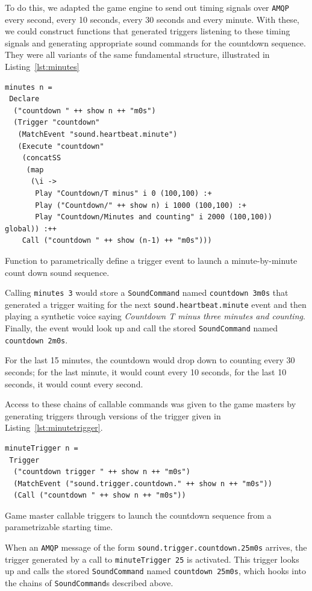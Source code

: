 To do this, we adapted the game engine to send out timing signals over
\texttt{AMQP} every second, every 10 seconds, every 30 seconds and
every minute. With these, we could construct functions that generated
triggers listening to these timing signals and generating appropriate
sound commands for the countdown sequence. They were all variants of
the same fundamental structure, illustrated in Listing~\ref{lst:minutes}

\begin{listing}
\begin{verbatim}
minutes n = 
 Declare 
  ("countdown " ++ show n ++ "m0s")
  (Trigger "countdown"
   (MatchEvent "sound.heartbeat.minute")
   (Execute "countdown" 
    (concatSS 
     (map 
      (\i -> 
       Play "Countdown/T minus" i 0 (100,100) :+
       Play ("Countdown/" ++ show n) i 1000 (100,100) :+
       Play "Countdown/Minutes and counting" i 2000 (100,100)) global)) :++
    Call ("countdown " ++ show (n-1) ++ "m0s")))
\end{verbatim}
\caption{Function to parametrically define a trigger event to launch a
minute-by-minute count down sound sequence.}
\label{lst:minutes}
\end{listing}

Calling \texttt{minutes 3} would store a \texttt{SoundCommand} named
\texttt{countdown 3m0s} that generated a trigger waiting for the next
\texttt{sound.heartbeat.minute} event and then playing a synthetic
voice saying \textit{Countdown T minus three minutes and
  counting}. Finally, the event would look up and call the stored
\texttt{SoundCommand} named \texttt{countdown 2m0s}.

For the last 15 minutes, the countdown would drop down to counting
every 30 seconds; for the last minute, it would count every 10 seconds, for
the last 10 seconds, it would count every second.

Access to these chains of callable commands was given to the game
masters by generating triggers through versions of the trigger given
in Listing~\ref{lst:minutetrigger}.

\begin{listing}
\begin{verbatim}
minuteTrigger n = 
 Trigger 
  ("countdown trigger " ++ show n ++ "m0s") 
  (MatchEvent ("sound.trigger.countdown." ++ show n ++ "m0s")) 
  (Call ("countdown " ++ show n ++ "m0s"))
\end{verbatim}
\caption{Game master callable triggers to launch the countdown
  sequence from a parametrizable starting time.}
\label{lst:minutetrigger}
\end{listing}

When an \texttt{AMQP} message of the form
\texttt{sound.trigger.countdown.25m0s} arrives, the trigger generated
by a call to \texttt{minuteTrigger 25} is activated. This trigger
looks up and calls the stored \texttt{SoundCommand} named
\texttt{countdown 25m0s}, which hooks into the chains of
\texttt{SoundCommand}s described above.

